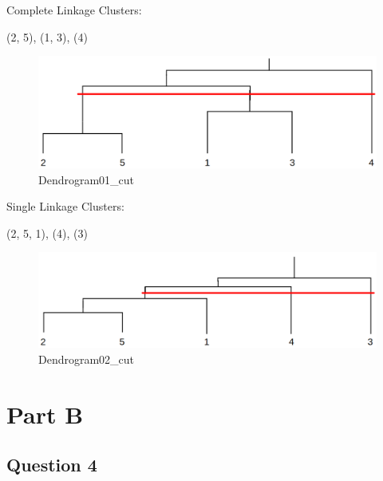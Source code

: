 \documentclass[11pt]{article}
\begin{document}
Complete Linkage Clusters:

(2, 5), (1, 3), (4)

\begin{figure}
\centering
\includegraphics{./dendrogram01_cut.png}
\caption{Dendrogram01\_cut}
\end{figure}

Single Linkage Clusters:

(2, 5, 1), (4), (3)

\begin{figure}
\centering
\includegraphics{./dendrogram02_cut.png}
\caption{Dendrogram02\_cut}
\end{figure}

    \hypertarget{part-b}{%
\section{Part B}\label{part-b}}

    \hypertarget{question-4}{%
\subsection{Question 4}\label{question-4}}
\end{document}
